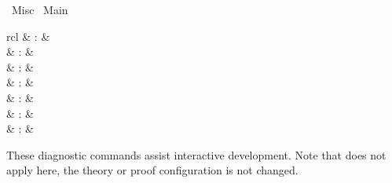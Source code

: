 %
\begin{isabellebody}%
\def\isabellecontext{Misc}%
%
\isadelimtheory
\isanewline
\isanewline
%
\endisadelimtheory
%
\isatagtheory
{}\isamarkupfalse%
\ Misc\isanewline
{}\ Main\isanewline
{}%
\endisatagtheory
{\isafoldtheory}%
%
\isadelimtheory
%
\endisadelimtheory
%
\isamarkuptrue%
%
\isamarkuptrue%
%
\begin{isamarkuptext}%
\begin{matharray}{rcl}
    \hypertarget{command.pr}{\hyperlink{command.pr}{\mbox{}}}\isa{{\isachardoublequote}\isactrlsup {\isacharasterisk}{\isachardoublequote}} & : & \isarkeep{\cdot} \\
    \hypertarget{command.thm}{\hyperlink{command.thm}{\mbox{}}}\isa{{\isachardoublequote}\isactrlsup {\isacharasterisk}{\isachardoublequote}} & : &  \\
    \hypertarget{command.term}{\hyperlink{command.term}{\mbox{}}}\isa{{\isachardoublequote}\isactrlsup {\isacharasterisk}{\isachardoublequote}} & : &  \\
    \hypertarget{command.prop}{\hyperlink{command.prop}{\mbox{}}}\isa{{\isachardoublequote}\isactrlsup {\isacharasterisk}{\isachardoublequote}} & : &  \\
    \hypertarget{command.typ}{\hyperlink{command.typ}{\mbox{}}}\isa{{\isachardoublequote}\isactrlsup {\isacharasterisk}{\isachardoublequote}} & : &  \\
    \hypertarget{command.prf}{\hyperlink{command.prf}{\mbox{}}}\isa{{\isachardoublequote}\isactrlsup {\isacharasterisk}{\isachardoublequote}} & : &  \\
    \hypertarget{command.full-prf}{\hyperlink{command.full-prf}{\mbox{}}}\isa{{\isachardoublequote}\isactrlsup {\isacharasterisk}{\isachardoublequote}} & : &  \\
  \end{matharray}

  These diagnostic commands assist interactive development.  Note that
  \hyperlink{command.undo}{\mbox{}} does not apply here, the theory or proof
  configuration is not changed.


\end{isamarkuptext}
\end{isabellebody}
